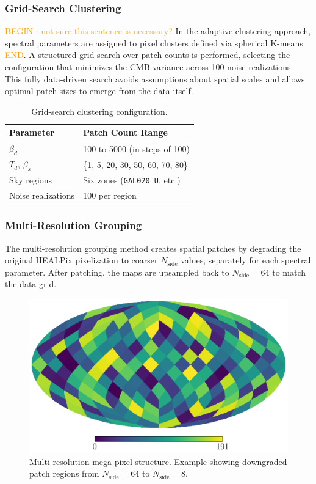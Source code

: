 \documentclass[fleqn,usenatbib]{mnras}
\newcommand{\je}[1]{\textcolor{orange}{#1}}
\begin{document}
\subsubsection*{Grid-Search Clustering}

\je{BEGIN : not sure this sentence is necessary?}
In the adaptive clustering approach, spectral parameters are assigned to pixel clusters defined via spherical K-means \je{END}. A structured grid search over patch counts is performed, selecting the configuration that minimizes the CMB variance across 100 noise realizations. This fully data-driven search avoids assumptions about spatial scales and allows optimal patch sizes to emerge from the data itself.

\begin{table}
    \centering
    \small
    \caption{Grid-search clustering configuration.}
    \begin{tabular}{@{}p{3.8cm}|p{4.5cm}@{}}
        \toprule
        \textbf{Parameter} & \textbf{Patch Count Range} \\
        \midrule
        \( \beta_d \) & 100 to 5000 (in steps of 100) \\
        \( T_d \), \( \beta_s \) & \{1, 5, 20, 30, 50, 60, 70, 80\} \\
        Sky regions & Six zones (\texttt{GAL020\_U}, etc.) \\
        Noise realizations & 100 per region \\
        \bottomrule
    \end{tabular}
\end{table}

\subsubsection*{Multi-Resolution Grouping}

The multi-resolution grouping method creates spatial patches by degrading the original HEALPix pixelization to coarser \( N_{\text{side}} \) values, separately for each spectral parameter. After patching, the maps are upsampled back to \( N_{\text{side}} = 64 \) to match the data grid.

\begin{figure}
    \centering
    \includegraphics[width=0.9\linewidth]{figures/multi_resolution_pixel_grouping.pdf}
    \caption{Multi-resolution mega-pixel structure. Example showing downgraded patch regions from \( N_{\text{side}} = 64 \) to \( N_{\text{side}} = 8 \).}
    \label{fig:multires_megapixels}
\end{figure}
\end{document}
